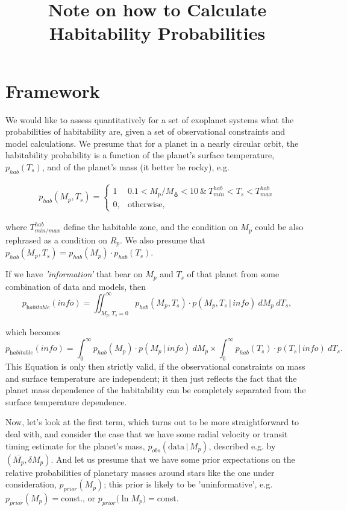 \documentclass[12pt,preprint]{aastex}
\title{Note on how to Calculate Habitability Probabilities} %
\begin{document}
\section{Framework}
\label{intro}

We would like to assess quantitatively for a set of exoplanet systems
what the probabilities of habitability 
are, given a set of observational constraints and model calculations.
We presume that for a planet in a nearly circular orbit, the habitability probability is a function of the planet's 
surface temperature, $p_{hab}(T_s)$, and of the planet's mass (it better be rocky), e.g. 

\begin{eqnarray}
p_{hab}(M_p,T_s) = 
\begin{cases}
1 &  0.1<M_p/M_\earth < 10\ \&\ T^{hab}_{min}<T_s< T^{hab}_{max}\\
0, & \text{otherwise,}
\end{cases}
\end{eqnarray}

where $T^{hab}_{min/max}$ define the habitable zone, and the condition on $M_p$ could be also
rephrased as a condition on $R_p$. We also presume that 
$p_{hab}(M_p,T_s) =  p_{hab}(M_p)\cdot p_{hab}(T_s)$. 

If we have {\it 'information'} that bear on $M_p$ and $T_s$ of that planet from some combination 
of data and models, then
\begin{equation}
p_{\mathrm habitable} (info) = \iint_{M_p,T_s=0}^{\infty}p_{hab}(M_p,T_s)\cdot p(M_p,T_s\, |\,  info)\  dM_p~dT_s,
\end{equation}

which becomes 
\begin{equation}
p_{\mathrm habitable} (info) = \int_{0}^{\infty}p_{hab}(M_p)\cdot p(M_p\, |\,  info)~dM_p\times
\int_{0}^{\infty}p_{hab}(T_s)\cdot p(T_s\, |\,  info)~dT_s .
\end{equation}
This Equation is only then strictly valid, if the observational constraints on mass and surface temperature
are independent; it then 
just reflects the fact that the planet mass dependence of the habitability can be completely separated 
from the surface temperature dependence.

Now, let's look at the first term, which turns out to be more straightforward to deal with, 
and consider the case that we have some radial velocity or transit timing estimate for the planet's mass,
$p_{obs}(\mathrm{data}\, | \, M_p)$, described e.g. by $(\overline{M_p},\delta M_p)$. And let us presume
that we have some prior expectations on the relative probabilities of planetary masses around stars 
like the one under consideration, $p_{prior}(M_p)$; this prior is likely to be 'uninformative', e.g.  
$p_{prior}(M_p)=$const., or $p_{prior}\bigl( \ln M_p\bigr )=$const.
\end{document}
